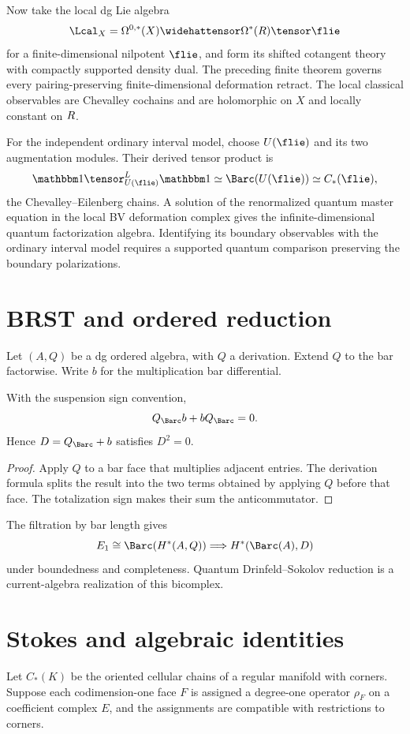 Now take the local dg Lie algebra
\[
 \Lcal_X=\Omega^{0,*}(X)\widehattensor\Omega^*(\R)\tensor\flie
\]
for a finite-dimensional nilpotent $\flie$, and form its shifted cotangent theory with compactly supported density dual. The preceding finite theorem governs every pairing-preserving finite-dimensional deformation retract. The local classical observables are Chevalley cochains and are holomorphic on $X$ and locally constant on $R$.

For the independent ordinary interval model, choose $U(\flie)$ and its two augmentation modules. Their derived tensor product is
\[
 \mathbbm1\tensor_{U(\flie)}^{\mathbb L}\mathbbm1
 \simeq\Barc(U(\flie))
 \simeq C_*(\flie),
\]
the Chevalley--Eilenberg chains.
A solution of the renormalized quantum master equation in the local BV deformation complex gives the infinite-dimensional quantum factorization algebra.
Identifying its boundary observables with the ordinary interval model requires a supported quantum comparison preserving the boundary polarizations.

\chapter{BRST and ordered reduction}
Let $(A,Q)$ be a dg ordered algebra, with $Q$ a derivation. Extend $Q$ to the bar factorwise. Write $b$ for the multiplication bar differential.

\begin{proposition}
With the suspension sign convention,
\[
 Q_{\Barc}b+bQ_{\Barc}=0.
\]
Hence $D=Q_{\Barc}+b$ satisfies $D^2=0$.
\end{proposition}
\begin{proof}
Apply $Q$ to a bar face that multiplies adjacent entries. The derivation formula splits the result into the two terms obtained by applying $Q$ before that face. The totalization sign makes their sum the anticommutator.
\end{proof}

The filtration by bar length gives
\[
 E_1\cong\Barc(H^*(A,Q))
 \Longrightarrow H^*(\Barc(A),D)
\]
under boundedness and completeness. Quantum Drinfeld--Sokolov reduction is a current-algebra realization of this bicomplex.

\chapter{Stokes and algebraic identities}
Let $C_*(K)$ be the oriented cellular chains of a regular manifold with corners. Suppose each codimension-one face $F$ is assigned a degree-one operator $\rho_F$ on a coefficient complex $E$, and the assignments are compatible with restrictions to corners.

